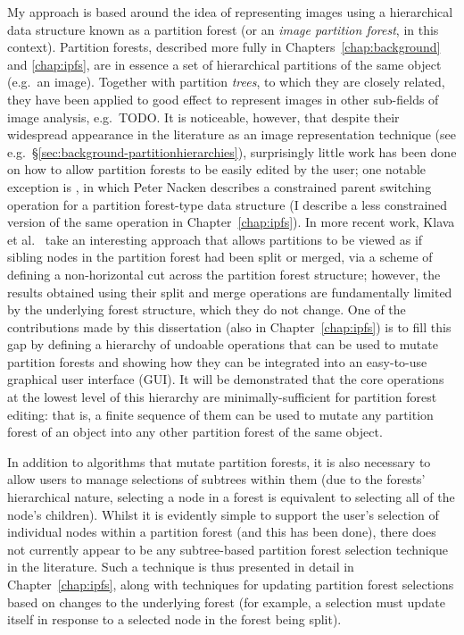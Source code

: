 My approach is based around the idea of representing images using a hierarchical data structure known as a partition forest (or an \emph{image partition forest}, in this context). Partition forests, described more fully in Chapters~\ref{chap:background} and \ref{chap:ipfs}, are in essence a set of hierarchical partitions of the same object (e.g.~an image). Together with partition \emph{trees}, to which they are closely related, they have been applied to good effect to represent images in other sub-fields of image analysis, e.g.~TODO. It is noticeable, however, that despite their widespread appearance in the literature as an image representation technique (see e.g.~\S\ref{sec:background-partitionhierarchies}), surprisingly little work has been done on how to allow partition forests to be easily edited by the user; one notable exception is \cite{nacken95}, in which Peter Nacken describes a constrained parent switching operation for a partition forest-type data structure (I describe a less constrained version of the same operation in Chapter~\ref{chap:ipfs}). In more recent work, Klava et al.~\cite{klava09} take an interesting approach that allows partitions to be viewed as if sibling nodes in the partition forest had been split or merged, via a scheme of defining a non-horizontal cut across the partition forest structure; however, the results obtained using their split and merge operations are fundamentally limited by the underlying forest structure, which they do not change. One of the contributions made by this dissertation (also in Chapter~\ref{chap:ipfs}) is to fill this gap by defining a hierarchy of undoable operations that can be used to mutate partition forests and showing how they can be integrated into an easy-to-use graphical user interface (GUI). It will be demonstrated that the core operations at the lowest level of this hierarchy are minimally-sufficient for partition forest editing: that is, a finite sequence of them can be used to mutate any partition forest of an object into any other partition forest of the same object.

In addition to algorithms that mutate partition forests, it is also necessary to allow users to manage selections of subtrees within them (due to the forests' hierarchical nature, selecting a node in a forest is equivalent to selecting all of the node's children). Whilst it is evidently simple to support the user's selection of individual nodes within a partition forest (and this has been done), there does not currently appear to be any subtree-based partition forest selection technique in the literature. Such a technique is thus presented in detail in Chapter~\ref{chap:ipfs}, along with techniques for updating partition forest selections based on changes to the underlying forest (for example, a selection must update itself in response to a selected node in the forest being split).

